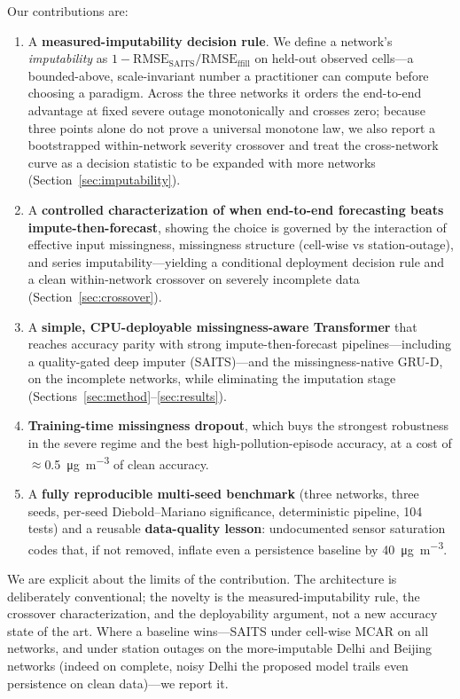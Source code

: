 \documentclass[review,3p,times]{elsarticle}
\newcommand{\ugm}{\si{\micro\gram\per\cubic\metre}}
\begin{document}
Our contributions are:
\begin{enumerate}
  \item A \textbf{measured-imputability decision rule}. We define a network's
  \emph{imputability} as $1-\mathrm{RMSE_{SAITS}}/\mathrm{RMSE_{ffill}}$ on
  held-out observed cells---a bounded-above, scale-invariant number a
  practitioner can compute before choosing a paradigm. Across the three networks
  it orders the end-to-end advantage at fixed severe outage monotonically and
  crosses zero; because three points alone do not prove a universal monotone
  law, we also report a bootstrapped within-network severity crossover and treat
  the cross-network curve as a decision statistic to be expanded with more
  networks (Section~\ref{sec:imputability}).
  \item A \textbf{controlled characterization of when end-to-end forecasting
  beats impute-then-forecast}, showing the choice is governed by the interaction
  of effective input missingness, missingness structure (cell-wise vs
  station-outage), and series imputability---yielding a conditional deployment
  decision rule and a clean within-network crossover on severely incomplete data
  (Section~\ref{sec:crossover}).
  \item A \textbf{simple, CPU-deployable missingness-aware Transformer} that
  reaches accuracy parity with strong impute-then-forecast pipelines---including
  a quality-gated deep imputer (SAITS)---and the missingness-native GRU-D, on the
  incomplete networks, while eliminating the imputation stage
  (Sections~\ref{sec:method}--\ref{sec:results}).
  \item \textbf{Training-time missingness dropout}, which buys the strongest
  robustness in the severe regime and the best high-pollution-episode accuracy,
  at a cost of $\approx$\SI{0.5}{\ugm} of clean accuracy.
  \item A \textbf{fully reproducible multi-seed benchmark} (three networks, three
  seeds, per-seed Diebold--Mariano significance, deterministic pipeline, 104
  tests) and a reusable \textbf{data-quality lesson}: undocumented sensor
  saturation codes that, if not removed, inflate even a persistence baseline by
  \SI{40}{\ugm}.
\end{enumerate}

We are explicit about the limits of the contribution. The architecture is
deliberately conventional; the novelty is the measured-imputability rule, the
crossover characterization, and the deployability argument, not a new accuracy
state of the art. Where a baseline wins---SAITS under cell-wise MCAR on all
networks, and under station outages on the more-imputable Delhi and Beijing
networks (indeed on complete, noisy Delhi the proposed model trails even
persistence on clean data)---we report it.
\end{document}
